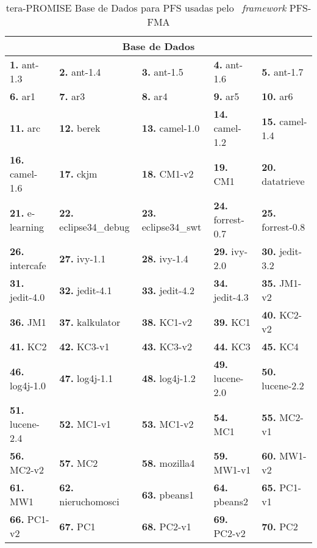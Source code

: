 \begin{table*}[!htbp]
\footnotesize
\centering
\caption{tera-PROMISE Base de Dados para PFS usadas pelo ~\textit{framework} PFS-FMA}
\label{data-sets}
\begin{tabular*}{\textwidth}{@{\extracolsep{\fill}} lllll}
\toprule
\multicolumn{5}{c}{Base de Dados}                                                             \\
\midrule
\textbf{1.} ant-1.3 & \textbf{2.} ant-1.4 & \textbf{3.} ant-1.5 & \textbf{4.} ant-1.6 & \textbf{5.} ant-1.7    \\
\textbf{6.} ar1 & \textbf{7.} ar3 & \textbf{8.} ar4 & \textbf{9.} ar5 & \textbf{10.} ar6    \\
\textbf{11.} arc & \textbf{12.} berek & \textbf{13.} camel-1.0 & \textbf{14.} camel-1.2 & \textbf{15.} camel-1.4    \\
\textbf{16.} camel-1.6 & \textbf{17.} ckjm & \textbf{18.} CM1-v2 & \textbf{19.} CM1 & \textbf{20.} datatrieve    \\
\textbf{21.} e-learning & \textbf{22.} eclipse34_debug & \textbf{23.} eclipse34_swt & \textbf{24.} forrest-0.7 & \textbf{25.} forrest-0.8    \\
\textbf{26.} intercafe & \textbf{27.} ivy-1.1 & \textbf{28.} ivy-1.4 & \textbf{29.} ivy-2.0 & \textbf{30.} jedit-3.2    \\
\textbf{31.} jedit-4.0 & \textbf{32.} jedit-4.1 & \textbf{33.} jedit-4.2 & \textbf{34.} jedit-4.3 & \textbf{35.} JM1-v2    \\
\textbf{36.} JM1 & \textbf{37.} kalkulator & \textbf{38.} KC1-v2 & \textbf{39.} KC1 & \textbf{40.} KC2-v2    \\
\textbf{41.} KC2 & \textbf{42.} KC3-v1 & \textbf{43.} KC3-v2 & \textbf{44.} KC3 & \textbf{45.} KC4    \\
\textbf{46.} log4j-1.0 & \textbf{47.} log4j-1.1 & \textbf{48.} log4j-1.2 & \textbf{49.} lucene-2.0 & \textbf{50.} lucene-2.2    \\
\textbf{51.} lucene-2.4 & \textbf{52.} MC1-v1 & \textbf{53.} MC1-v2 & \textbf{54.} MC1 & \textbf{55.} MC2-v1    \\
\textbf{56.} MC2-v2 & \textbf{57.} MC2 & \textbf{58.} mozilla4 & \textbf{59.} MW1-v1 & \textbf{60.} MW1-v2    \\
\textbf{61.} MW1 & \textbf{62.} nieruchomosci & \textbf{63.} pbeans1 & \textbf{64.} pbeans2 & \textbf{65.} PC1-v1    \\
\textbf{66.} PC1-v2 & \textbf{67.} PC1 & \textbf{68.} PC2-v1 & \textbf{69.} PC2-v2 & \textbf{70.} PC2    \\

\end{tabular*}
\end{table*}
